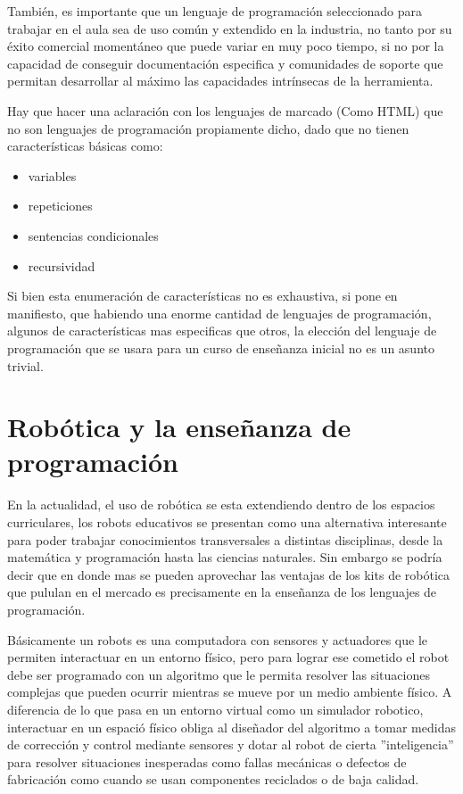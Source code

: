 También, es importante que un lenguaje de programación seleccionado para trabajar en el aula sea de uso común y extendido en la industria, no tanto por su éxito comercial momentáneo que puede variar en muy poco tiempo, si no por la capacidad de conseguir documentación especifica y comunidades de soporte que permitan desarrollar al máximo las capacidades intrínsecas de la herramienta.

Hay que hacer una aclaración con los lenguajes de marcado (Como HTML) que no son lenguajes de programación propiamente dicho, dado que no tienen características básicas como:

\begin{itemize}
   \item variables
   \item repeticiones
   \item sentencias condicionales
   \item recursividad
 \end{itemize} 

Si bien esta enumeración de características no es exhaustiva, si pone en manifiesto, que habiendo una enorme cantidad de lenguajes de programación, algunos de características mas especificas que otros, la elección del lenguaje de programación que se usara para un curso de enseñanza inicial no es un asunto trivial.


\section{Robótica y la enseñanza de programación}

En la actualidad, el uso de robótica se esta extendiendo dentro de los espacios curriculares, los robots educativos se presentan como una alternativa interesante para poder trabajar conocimientos transversales a distintas disciplinas, desde la matemática y programación hasta las ciencias naturales. Sin embargo se podría decir que en donde mas se pueden aprovechar las ventajas de los kits de robótica que pululan en el mercado es precisamente en la enseñanza de los lenguajes de programación.

Básicamente un robots es una computadora con sensores y actuadores que le permiten interactuar en un entorno físico, pero para lograr ese cometido el robot debe ser programado con un algoritmo que le permita resolver las situaciones complejas que pueden ocurrir mientras se mueve por un medio ambiente físico.
A diferencia de lo que pasa en un entorno virtual como un simulador robotico, interactuar en un espació físico obliga al diseñador del algoritmo a tomar medidas de corrección y control mediante sensores y dotar al robot de cierta ''inteligencia'' para resolver situaciones inesperadas como fallas mecánicas o defectos de fabricación como cuando se usan componentes reciclados o de baja calidad.

